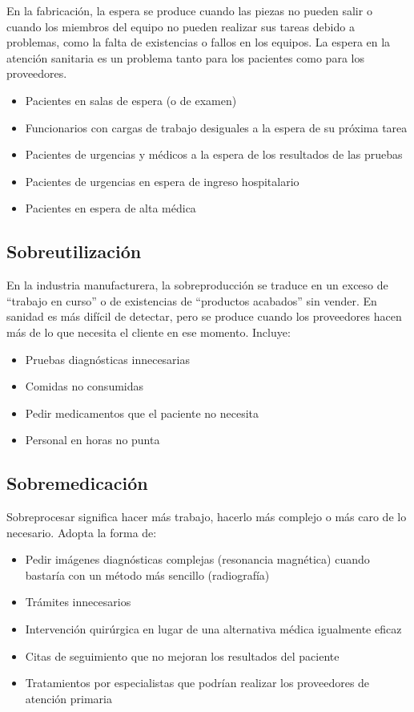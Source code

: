 En la fabricación, la espera se produce cuando las piezas no pueden salir o cuando los miembros del equipo no pueden realizar sus tareas debido a problemas, como la falta de existencias o fallos en los equipos.
La espera en la atención sanitaria es un problema tanto para los pacientes como para los proveedores.

\begin{itemize}
    \item Pacientes en salas de espera (o de examen)
    \item Funcionarios con cargas de trabajo desiguales a la espera de su próxima tarea
    \item Pacientes de urgencias y médicos a la espera de los resultados de las pruebas
    \item Pacientes de urgencias en espera de ingreso hospitalario
    \item Pacientes en espera de alta médica
\end{itemize}

\subsection{Sobreutilización}

En la industria manufacturera, la sobreproducción se traduce en un exceso de ``trabajo en curso'' o de existencias de ``productos acabados'' sin vender.
En sanidad es más difícil de detectar, pero se produce cuando los proveedores hacen más de lo que necesita el cliente en ese momento.
Incluye:

\begin{itemize}
    \item Pruebas diagnósticas innecesarias
    \item Comidas no consumidas
    \item Pedir medicamentos que el paciente no necesita
    \item Personal en horas no punta
\end{itemize}

\subsection{Sobremedicación}

Sobreprocesar significa hacer más trabajo, hacerlo más complejo o más caro de lo necesario.
Adopta la forma de:

\begin{itemize}
    \item Pedir imágenes diagnósticas complejas (resonancia magnética) cuando bastaría con un método más sencillo (radiografía)
    \item Trámites innecesarios
    \item Intervención quirúrgica en lugar de una alternativa médica igualmente eficaz
    \item Citas de seguimiento que no mejoran los resultados del paciente
    \item Tratamientos por especialistas que podrían realizar los proveedores de atención primaria
\end{itemize}

